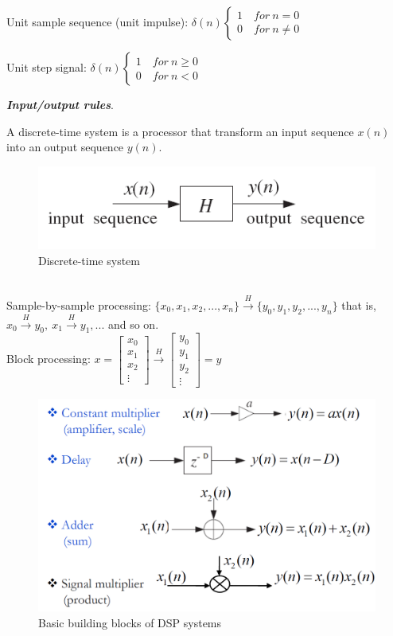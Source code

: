\documentclass[11pt, a4paper]{article}
\begin{document}
Unit sample sequence (unit impulse): $\displaystyle \delta(n) \begin{cases}
    1 \quad for\ n=0 \\
    0 \quad for\ n\neq 0
\end{cases} $

Unit step signal: $\displaystyle \delta(n) \begin{cases}
    1 \quad for\ n\geq 0 \\
    0 \quad for\ n< 0
\end{cases} $

\textbf{\textit{Input/output rules}}.

A discrete-time system is a processor that transform an input sequence $x(n)$ into an output sequence $y(n)$.
\begin{figure}[h!]
    \centering
    \includegraphics[width=0.4\linewidth]{img/29.png}
    \caption{Discrete-time system}
\end{figure}\\
Sample-by-sample processing: $\{x_0,x_1,x_2,...,x_n\} \xrightarrow{H} \{y_0,y_1,y_2,...,y_n\}$ that is, $x_0 \xrightarrow{H}y_0, \ x_1 \xrightarrow{H} y_1,...$ and so on.\\
Block processing: $x = \begin{bmatrix}
    x_0 \\
    x_1 \\ 
    x_2 \\
    \vdots 
\end{bmatrix} \xrightarrow{H} \begin{bmatrix}
    y_0 \\
    y_1 \\ 
    y_2 \\
    \vdots 
\end{bmatrix}=y$\\
\begin{figure}[h!]
    \centering
    \includegraphics[width=0.5\linewidth]{img/30.png}
    \caption{Basic building blocks of DSP systems}
\end{figure}
\end{document}
